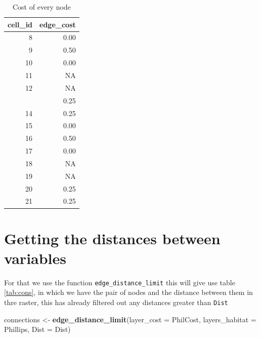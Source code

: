 \documentclass[]{article}
\newenvironment{Shaded}{\begin{snugshade}}{\end{snugshade}}
\newcommand{\DataTypeTok}[1]{\textcolor[rgb]{0.13,0.29,0.53}{#1}}
\newcommand{\KeywordTok}[1]{\textcolor[rgb]{0.13,0.29,0.53}{\textbf{#1}}}
\newcommand{\NormalTok}[1]{#1}
\newcommand{\StringTok}[1]{\textcolor[rgb]{0.31,0.60,0.02}{#1}}
\begin{document}
\begin{table}[!h]

\caption{\label{tab:CostTable}Cost of every node}
\centering
\begin{tabular}[t]{rr}
\toprule
cell\_id & edge\_cost\\
\midrule
\rowcolor{gray!6}  8 & 0.00\\
9 & 0.50\\
\rowcolor{gray!6}  10 & 0.00\\
11 & NA\\
\rowcolor{gray!6}  12 & NA\\
\addlinespace
13 & 0.25\\
\rowcolor{gray!6}  14 & 0.25\\
15 & 0.00\\
\rowcolor{gray!6}  16 & 0.50\\
17 & 0.00\\
\addlinespace
\rowcolor{gray!6}  18 & NA\\
19 & NA\\
\rowcolor{gray!6}  20 & 0.25\\
21 & 0.25\\
\bottomrule
\end{tabular}
\end{table}

\hypertarget{getting-the-distances-between-variables}{%
\section{Getting the distances between variables}\label{getting-the-distances-between-variables}}

For that we use the function \texttt{edge\_distance\_limit} this will give use table \ref{tab:cons}, in which we have the pair of nodes and the distance between them in thre raster, this has already filtered out any distances greater than \texttt{Dist}

\begin{Shaded}
\begin{Highlighting}[]
\NormalTok{connections <-}\StringTok{ }\KeywordTok{edge_distance_limit}\NormalTok{(}\DataTypeTok{layer_cost =}\NormalTok{ PhilCost, }\DataTypeTok{layers_habitat =}\NormalTok{ Phillips, }
    \DataTypeTok{Dist =}\NormalTok{ Dist)}
\end{Highlighting}
\end{Shaded}
\end{document}
